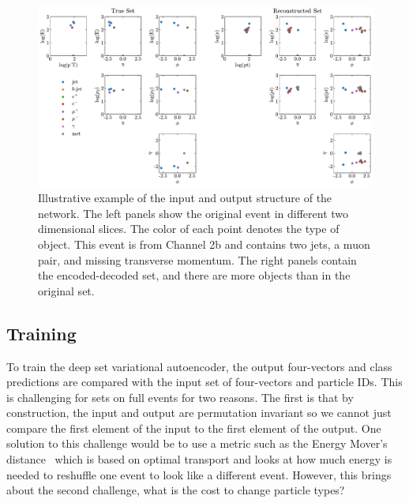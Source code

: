 \documentclass[submission, Phys]{SciPost}
\begin{document}
\begin{figure}[t]
\begin{center}
    \includegraphics[width=\linewidth]{figures/Chan2b_1e-06_100_BestReconstruction.pdf}
    \caption{Illustrative example of the input and output structure of the network.
    The left panels show the original event in different two dimensional slices.
    The color of each point denotes the type of object.
    This event is from Channel 2b and contains two jets, a muon pair, and missing transverse momentum.
    The right panels contain the encoded-decoded set, and there are more objects than in the original set.
    }
    \label{fig:set_example}
    \end{center}
\end{figure}


\subsection{Training}
\label{sec:training}
To train the deep set variational autoencoder, the output four-vectors and class predictions are compared with the input set of four-vectors and particle IDs.
This is challenging for sets on full events for two reasons.
The first is that by construction, the input and output are permutation invariant so we cannot just compare the first element of the input to the first element of the output.
One solution to this challenge would be to use a metric such as the Energy Mover's distance~\cite{Komiske:2019fks} which is based on optimal transport and looks at how much energy is needed to reshuffle one event to look like a different event.
However, this brings about the second challenge, what is the cost to change particle types?
\end{document}
